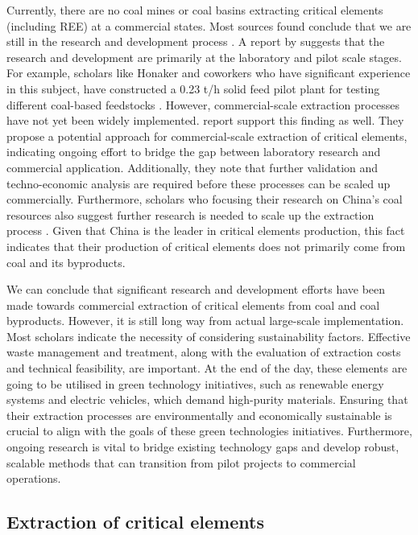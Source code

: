 \documentclass[11pt,a4paper,]{article}
\begin{document}
Currently, there are no coal mines or coal basins extracting critical elements (including REE) at a commercial states. Most sources found conclude that we are still in the research and development process \autocite{Hodgkinson2020,DAI2018155,Eterigho2021,osti_1808639,TALAN2022107897}. A report by \textcite{Eterigho2021} suggests that the research and development are primarily at the laboratory and pilot scale stages. For example, scholars like Honaker and coworkers who have significant experience in this subject, have constructed a 0.23 t/h solid feed pilot plant for testing different coal-based feedstocks \autocite{osti_1808639}. However, commercial-scale extraction processes have not yet been widely implemented. \textcite{TALAN2022107897} report support this finding as well. They propose a potential approach for commercial-scale extraction of critical elements, indicating ongoing effort to bridge the gap between laboratory research and commercial application. Additionally, they note that further validation and techno-economic analysis are required before these processes can be scaled up commercially. Furthermore, scholars who focusing their research on China's coal resources also suggest further research is needed to scale up the extraction process \autocite{Qin2015,Qin2015b,Liu2024,Zhao2019,ZOU2023105245}. Given that China is the leader in critical elements production, this fact indicates that their production of critical elements does not primarily come from coal and its byproducts.

We can conclude that significant research and development efforts have been made towards commercial extraction of critical elements from coal and coal byproducts. However, it is still long way from actual large-scale implementation. Most scholars indicate the necessity of considering sustainability factors. Effective waste management and treatment, along with the evaluation of extraction costs and technical feasibility, are important. At the end of the day, these elements are going to be utilised in green technology initiatives, such as renewable energy systems and electric vehicles, which demand high-purity materials. Ensuring that their extraction processes are environmentally and economically sustainable is crucial to align with the goals of these green technologies initiatives. Furthermore, ongoing research is vital to bridge existing technology gaps and develop robust, scalable methods that can transition from pilot projects to commercial operations.

\subsection{Extraction of critical elements}\label{extraction-of-critical-elements}
\end{document}
